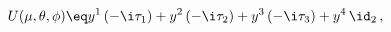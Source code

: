 \begin{equation} \label{U}
U(\mu, \theta, \phi) \eq  y^1 \,(-\i \tau_1) + y^2 \,(-\i \tau_2) +
                          y^3 \,(-\i \tau_3) + y^4 \,\id_2 \,,
\end{equation}

